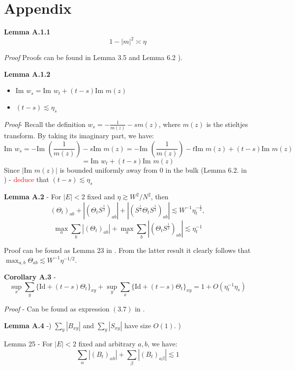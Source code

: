 \documentclass[11pt]{article}
\newenvironment{boxt}[1]
  {\begin{mdframed}\noindent\textbf{#1}\normalfont\space}
  {\end{mdframed}}
\newcommand{\im}{\text{Im }}
\begin{document}
\newpage




\section{Appendix}
\label{sec:appendix}

\begin{boxt}{Lemma A.1.1} \label{lemma-a11} $$ 1-|m|^2 \asymp \eta$$ 
\end{boxt}
\textit{Proof} Proofs can be found in Lemma 3.5 \cite{21} and Lemma 6.2 \cite{dynamic}). 

\begin{boxt}{Lemma A.1.2} \label{lemma-a12} 
\begin{itemize}
\item $ \im w_s = \im w_t + (t-s)\im m(z)$ 
\item $(t-s)\lesssim \eta_s $
\end{itemize}

\end{boxt}
\textit{Proof}- Recall the definition $w_s = -\frac{1}{m(z)} - sm(z)$, where $m(z)$ is the stieltjes transform. By taking its imaginary part, we have: $$\im w_s = -\im \left( \frac{1}{m(z)}\right)-s\im m(z)= -\im \left( \frac{1}{m(z)}\right)-t\im m(z) + (t-s)\im m(z)$$
$$=\im w_t + (t-s)\im m(z)$$
Since $|\im m(z)|$ is bounded uniformly away from $0$ in the bulk (Lemma 6.2. in \cite{dynamic}) - \textcolor{red}{deduce} that $(t-s)\lesssim \eta_s $

\begin{boxt}{Lemma A.2} \label{lemma-a2} -
 For $|E|<2$ fixed and $\eta\gtrsim W^2/N^2$, then $$(\Theta_t)_{ab} + |(\Theta_tS^{\frac{1}{2}})_{ab}| + |\left(S^{\frac{1}{2}}\Theta_t S^{\frac{1}{2}}\right)_{ab}|\lesssim W^{-1}\eta_t^{-\frac{1}{2}}, $$
 $$\max_a \sum_b |(\Theta_t)_{ab}|+\max_a \sum_b |(\Theta_tS^{\frac{1}{2}})_{ab}|\lesssim \eta_t^{-1}$$
\end{boxt}
Proof can be found as Lemma 23 in \cite{bandSDE}. From the latter result it clearly follows that $\max_{a,b}\Theta_{ab} \lesssim W^{-1}\eta^{-1/2}$. 

\begin{boxt}{Corollary A.3} \label{cor-a3} -
$$\sup_x \sum_y \{\text{Id}+(t-s)\Theta_t\}_{xy} + \sup_y \sum_x \{\text{Id} + (t-s)\Theta_t\}_{xy} = 1+O(\eta_t^{-1}\eta_s)$$
 \end{boxt}
 \textit{Proof} - Can be found as expression $(3.7)$ in \cite{bandSDE}. 

\begin{boxt}{Lemma A.4} \label{lemma-a4} -) $\sum_y |B_{xy}|$ and $\sum_y |S_{xy}|$ have size $O(1)$. )

 Lemma 25 \cite{bandSDE} - For $|E|<2$ fixed and arbitrary $a, b$, we have: $$\sum_\alpha |(B_t)_{\alpha b}| + \sum_{\beta}|(B_t)_{a\beta}|\lesssim 1$$
 \end{boxt}
 
\end{document}
